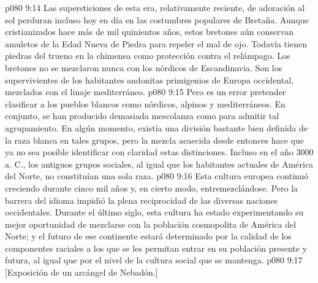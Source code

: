 \vs p080 9:14 Las supersticiones de esta era, relativamente reciente, de adoración al sol perduran incluso hoy en día en las costumbres populares de Bretaña. Aunque cristianizados hace más de mil quinientos años, estos bretones aún conservan amuletos de la Edad Nueva de Piedra para repeler el mal de ojo. Todavía tienen piedras del trueno en la chimenea como protección contra el relámpago. Los bretones no se mezclaron nunca con los nórdicos de Escandinavia. Son los supervivientes de los habitantes andonitas primigenios de Europa occidental, mezclados con el linaje mediterráneo.
\vs p080 9:15 \pc Pero es un error pretender clasificar a los pueblos blancos como nórdicos, alpinos y mediterráneos. En conjunto, se han producido demasiada mescolanza como para admitir tal agrupamiento. En algún momento, existía una división bastante bien definida de la raza blanca en tales grupos, pero la mezcla acaecida desde entonces hace que ya no sea posible identificar con claridad estas distinciones. Incluso en el año 3000 a. C., los antiguos grupos sociales, al igual que los habitantes actuales de América del Norte, no constituían una sola raza.
\vs p080 9:16 Esta cultura europea continuó creciendo durante cinco mil años y, en cierto modo, entremezclándose. Pero la barrera del idioma impidió la plena reciprocidad de las diversas naciones occidentales. Durante el último siglo, esta cultura ha estado experimentando su mejor oportunidad de mezclarse con la población cosmopolita de América del Norte; y el futuro de ese continente estará determinado por la calidad de los componentes raciales a los que se les permitan entrar en su población presente y futura, al igual que por el nivel de la cultura social que se mantenga.
\vsetoff
\vs p080 9:17 [Exposición de un arcángel de Nebadón.]

